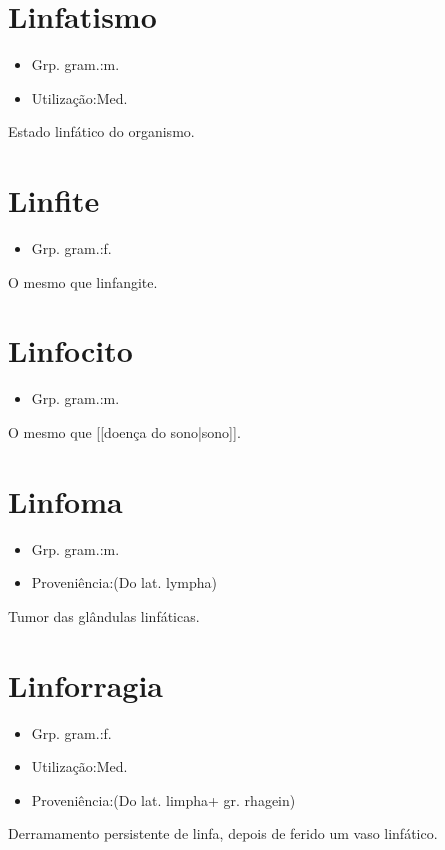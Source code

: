 \section{Linfatismo}
\begin{itemize}
\item {Grp. gram.:m.}
\end{itemize}
\begin{itemize}
\item {Utilização:Med.}
\end{itemize}
Estado linfático do organismo.
\section{Linfite}
\begin{itemize}
\item {Grp. gram.:f.}
\end{itemize}
O mesmo que \textunderscore linfangite\textunderscore .
\section{Linfocito}
\begin{itemize}
\item {Grp. gram.:m.}
\end{itemize}
O mesmo que [[doença do sono|sono]].
\section{Linfoma}
\begin{itemize}
\item {Grp. gram.:m.}
\end{itemize}
\begin{itemize}
\item {Proveniência:(Do lat. \textunderscore lympha\textunderscore )}
\end{itemize}
Tumor das glândulas linfáticas.
\section{Linforragia}
\begin{itemize}
\item {Grp. gram.:f.}
\end{itemize}
\begin{itemize}
\item {Utilização:Med.}
\end{itemize}
\begin{itemize}
\item {Proveniência:(Do lat. \textunderscore limpha\textunderscore  + gr. \textunderscore rhagein\textunderscore )}
\end{itemize}
Derramamento persistente de linfa, depois de ferido um vaso linfático.
